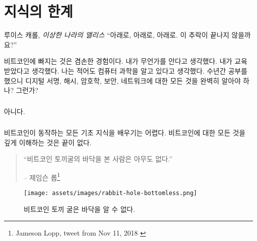 \chapter{지식의 한계}
\label{les:7}

\begin{chapquote}{루이스 캐롤, \textit{이상한 나라의 앨리스}}
	\enquote{아래로, 아래로, 아래로. 이 추락이 끝나지 않을까요?}
\end{chapquote}

비트코인에 빠지는 것은 겸손한 경험이다. 
내가 무언가를 안다고 생각했다. 
내가 교육받았다고 생각했다. 
나는 적어도 컴퓨터 과학을 알고 있다고 생각했다. 
수년간 공부를 했으니 디지털 서명,
해시, 암호학, 보안, 네트워크에 대한 모든 것을 완벽히 알아야 하나? 그런가?

\paragraph{}
아니다.

\paragraph{}
비트코인이 동작하는 모든 기초 지식을 배우기는 어렵다. 
비트코인에 대한 모든 것을 깊게 이해하는 것은 끝이 없다.

\begin{quotation}\begin{samepage}
		\enquote{비트코인 토끼굴의 바닥을 본 사람은 아무도 없다.}
		\begin{flushright} -- 제임슨 롭\footnote{Jameson Lopp, tweet from Nov 11, 2018 \cite{lopp-tweet}}
\end{flushright}\end{samepage}\end{quotation}

\begin{figure}
	\centering
	\texttt{[image: assets/images/rabbit-hole-bottomless.png]}
	\caption{비트코인 토끼 굴은 바닥을 알 수 없다.}
	\label{fig:rabbit-hole-bottomless}
\end{figure}

